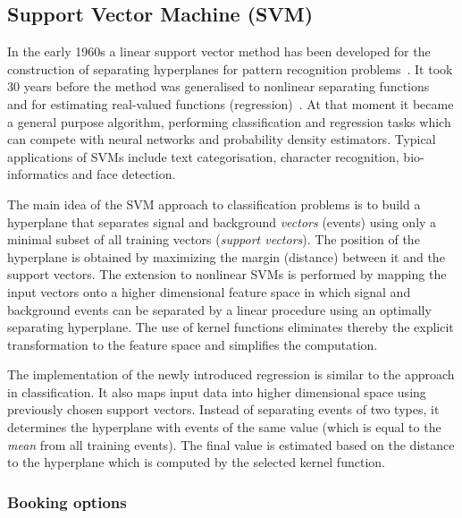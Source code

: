 \subsection{Support Vector Machine (SVM)}
\label{sec:SVM}

In the early 1960s a linear support vector method
has been developed for the construction of
separating hyperplanes for pattern recognition problems~\cite{Vapnik1963,Vapnik1964}. 
It took 30 years before the method was generalised to nonlinear separating 
functions~\cite{Vapnik1992,Vapnik1995a} and for estimating real-valued functions 
(regression)~\cite{Vapnik1995b}. At that moment it became a general purpose algorithm, 
performing classification and regression tasks which can compete with neural networks 
and probability density estimators. Typical applications of SVMs include text 
categorisation, character recognition, bio-informatics and face detection. 

The main idea of the SVM approach to classification problems is to build a hyperplane 
that separates signal and background {\em vectors} (events) using only a minimal subset 
of all training vectors ({\em support vectors}). The position of the hyperplane is 
obtained by maximizing the margin (distance) between it and the support vectors.  
The extension to nonlinear SVMs is performed by mapping the input vectors onto 
a higher dimensional feature space in which signal and background events can be 
separated by a linear procedure using an optimally separating hyperplane. The use 
of kernel functions eliminates thereby the explicit transformation to the feature 
space and simplifies the computation.

The implementation of the newly introduced regression is similar to the approach in classification.
It also maps input data into higher dimensional space using previously chosen support 
vectors. Instead of separating events of two types, it determines the hyperplane with 
events of the same value (which is equal to the {\em mean} from all training events). 
The final value is estimated based on the distance to the hyperplane which is computed by the selected kernel function.%
\subsubsection{Booking options}

